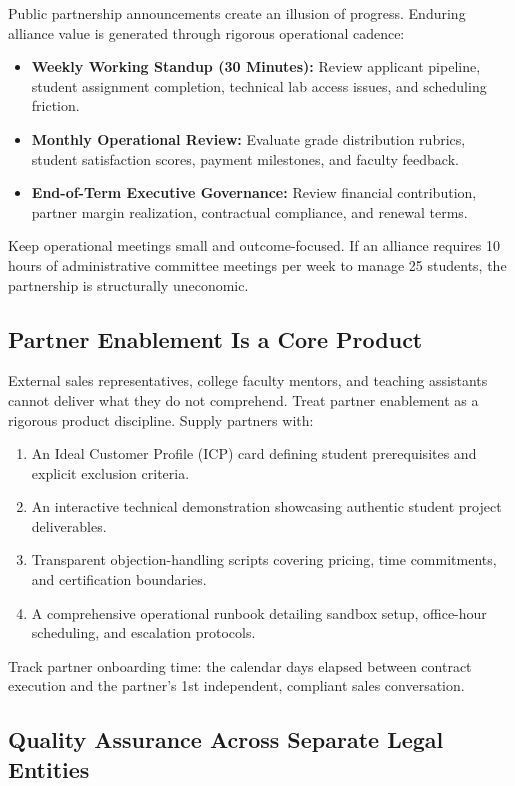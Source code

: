 Public partnership announcements create an illusion of progress. Enduring alliance value is generated through rigorous operational cadence:
\begin{itemize}
\item \textbf{Weekly Working Standup (30 Minutes):} Review applicant pipeline, student assignment completion, technical lab access issues, and scheduling friction.
\item \textbf{Monthly Operational Review:} Evaluate grade distribution rubrics, student satisfaction scores, payment milestones, and faculty feedback.
\item \textbf{End-of-Term Executive Governance:} Review financial contribution, partner margin realization, contractual compliance, and renewal terms.
\end{itemize}
Keep operational meetings small and outcome-focused. If an alliance requires 10 hours of administrative committee meetings per week to manage 25 students, the partnership is structurally uneconomic.

\subsection{Partner Enablement Is a Core Product}
\label{sec:partner_enablement_as_product}

External sales representatives, college faculty mentors, and teaching assistants cannot deliver what they do not comprehend. Treat partner enablement as a rigorous product discipline. Supply partners with:
\begin{enumerate}
\item An Ideal Customer Profile (ICP) card defining student prerequisites and explicit exclusion criteria.
\item An interactive technical demonstration showcasing authentic student project deliverables.
\item Transparent objection-handling scripts covering pricing, time commitments, and certification boundaries.
\item A comprehensive operational runbook detailing sandbox setup, office-hour scheduling, and escalation protocols.
\end{enumerate}
Track partner onboarding time: the calendar days elapsed between contract execution and the partner's 1st independent, compliant sales conversation.

\subsection{Quality Assurance Across Separate Legal Entities}
\label{sec:quality_assurance_separate_entities}

